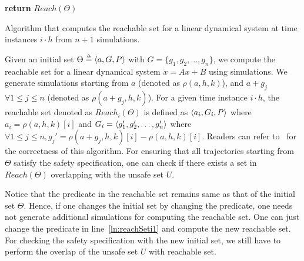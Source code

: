 \vspace{-0.4cm}
\begin{algorithm}[h]
\SetAlgoVlined
{}
{\bf return} $Reach(\Theta)$\;
\caption{Algorithm that computes the reachable set for a linear dynamical system at time instances $i \cdot h$ from $n+1$ simulations.}
\label{alg:algoFullInfo}
\end{algorithm}
\vspace{-0.4cm}

Given an initial set $\Theta \deq \tup{a, G, P}$ with $G = \{g_1, g_2, \ldots, g_n\}$, we compute the reachable set for a linear dynamical system $\dot{x} = Ax + B$ using simulations.
%
We generate simulations starting from $a$ (denoted as $\rho(a, h, k)$), and $a+g_j$ $\forall 1\leq j \leq n$ (denoted as $\rho(a+g_j, h, k)$). 
%
For a given time instance $i\cdot h$, the reachable set denoted as $Reach_i(\Theta)$ is defined as $\tup{a_i, G_i, P}$ where $a_i = \rho(a, h, k)[i]$ and $G_i = \tup{g_1', g_2', \ldots, g_n'}$ where $\forall 1\leq j \leq n, g_j' = \rho(a+g_j, h, k)[i] - \rho(a, h, k)[i]$. 
%
Readers can refer to~\cite{bak2017tacas} for the correctness of this algorithm.
%
For ensuring that all trajectories starting from $\Theta$ satisfy the safety specification, one can check if there exists a set in $Reach(\Theta)$ overlapping with the unsafe set $U$.
%

\begin{remark}
\label{rem:predConst}
Notice that the predicate in the reachable set remains same as that of the initial set $\Theta$. Hence, if one changes the initial set by changing the predicate, one needs not generate additional simulations for computing the reachable set. One can just change the predicate in line~\ref{ln:reachSeti1} and compute the new reachable set. For checking the safety specification with the new initial set, we still have to perform the overlap of the unsafe set $U$ with reachable set.
\end{remark}

